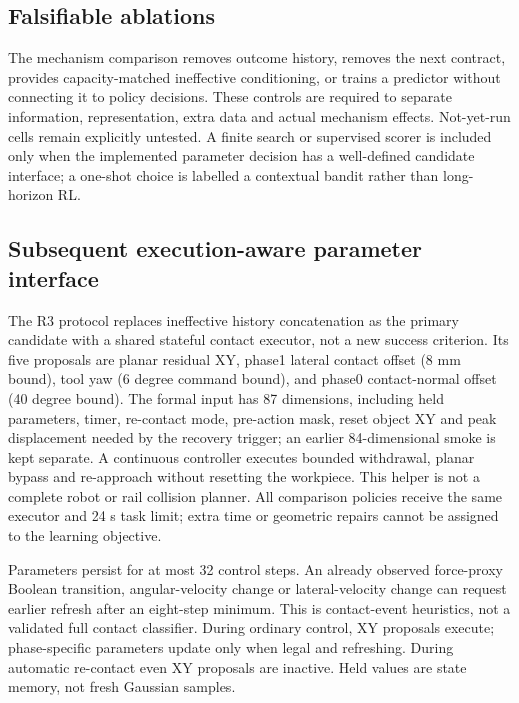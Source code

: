 
\subsection{Falsifiable ablations}
The mechanism comparison removes outcome history, removes the next contract, provides capacity-matched ineffective conditioning, or trains a predictor without connecting it to policy decisions. These controls are required to separate information, representation, extra data and actual mechanism effects. Not-yet-run cells remain explicitly untested. A finite search or supervised scorer is included only when the implemented parameter decision has a well-defined candidate interface; a one-shot choice is labelled a contextual bandit rather than long-horizon RL.

\subsection{Subsequent execution-aware parameter interface}
The R3 protocol replaces ineffective history concatenation as the primary candidate with a shared stateful contact executor, not a new success criterion. Its five proposals are planar residual XY, phase1 lateral contact offset (8 mm bound), tool yaw (6 degree command bound), and phase0 contact-normal offset (40 degree bound). The formal input has 87 dimensions, including held parameters, timer, re-contact mode, pre-action mask, reset object XY and peak displacement needed by the recovery trigger; an earlier 84-dimensional smoke is kept separate. A continuous controller executes bounded withdrawal, planar bypass and re-approach without resetting the workpiece. This helper is not a complete robot or rail collision planner. All comparison policies receive the same executor and 24 s task limit; extra time or geometric repairs cannot be assigned to the learning objective.

Parameters persist for at most 32 control steps. An already observed force-proxy Boolean transition, angular-velocity change or lateral-velocity change can request earlier refresh after an eight-step minimum. This is contact-event heuristics, not a validated full contact classifier. During ordinary control, XY proposals execute; phase-specific parameters update only when legal and refreshing. During automatic re-contact even XY proposals are inactive. Held values are state memory, not fresh Gaussian samples.

